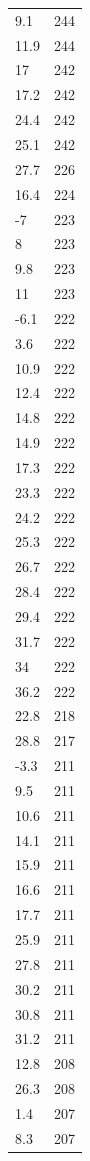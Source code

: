 \begin{table}[ht]
\begin{tabular}{lr}
  9.1 & 244 \\ 
  11.9 & 244 \\ 
  17 & 242 \\ 
  17.2 & 242 \\ 
  24.4 & 242 \\ 
  25.1 & 242 \\ 
  27.7 & 226 \\ 
  16.4 & 224 \\ 
  -7 & 223 \\ 
  8 & 223 \\ 
  9.8 & 223 \\ 
  11 & 223 \\ 
  -6.1 & 222 \\ 
  3.6 & 222 \\ 
  10.9 & 222 \\ 
  12.4 & 222 \\ 
  14.8 & 222 \\ 
  14.9 & 222 \\ 
  17.3 & 222 \\ 
  23.3 & 222 \\ 
  24.2 & 222 \\ 
  25.3 & 222 \\ 
  26.7 & 222 \\ 
  28.4 & 222 \\ 
  29.4 & 222 \\ 
  31.7 & 222 \\ 
  34 & 222 \\ 
  36.2 & 222 \\ 
  22.8 & 218 \\ 
  28.8 & 217 \\ 
  -3.3 & 211 \\ 
  9.5 & 211 \\ 
  10.6 & 211 \\ 
  14.1 & 211 \\ 
  15.9 & 211 \\ 
  16.6 & 211 \\ 
  17.7 & 211 \\ 
  25.9 & 211 \\ 
  27.8 & 211 \\ 
  30.2 & 211 \\ 
  30.8 & 211 \\ 
  31.2 & 211 \\ 
  12.8 & 208 \\ 
  26.3 & 208 \\ 
  1.4 & 207 \\ 
  8.3 & 207 \\ 

\end{tabular}
\end{table}
